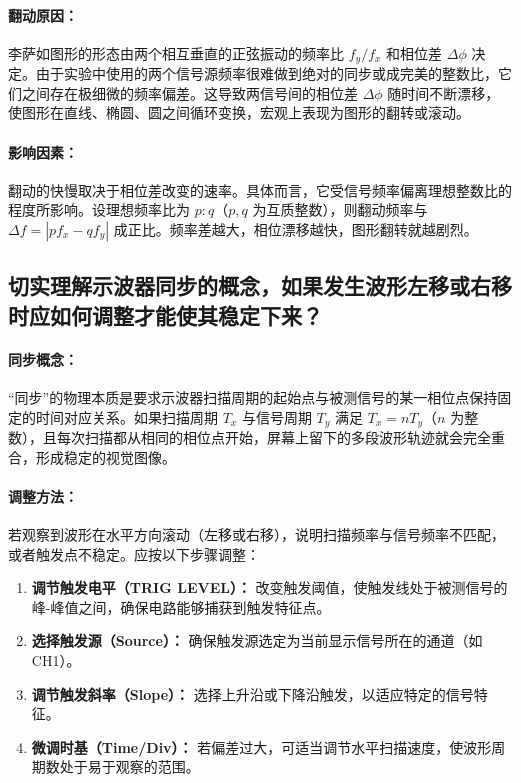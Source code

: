 \documentclass[]{../template/Report}%
\begin{document}
\paragraph{翻动原因：} 李萨如图形的形态由两个相互垂直的正弦振动的频率比 $f_y/f_x$ 和相位差 $\Delta\phi$ 决定。由于实验中使用的两个信号源频率很难做到绝对的同步或成完美的整数比，它们之间存在极细微的频率偏差。这导致两信号间的相位差 $\Delta\phi$ 随时间不断漂移，使图形在直线、椭圆、圆之间循环变换，宏观上表现为图形的翻转或滚动。

\paragraph{影响因素：} 翻动的快慢取决于相位差改变的速率。具体而言，它受信号频率偏离理想整数比的程度所影响。设理想频率比为 $p:q$（$p, q$ 为互质整数），则翻动频率与 $\Delta f = |p f_x - q f_y|$ 成正比。频率差越大，相位漂移越快，图形翻转就越剧烈。

\subsection{切实理解示波器同步的概念，如果发生波形左移或右移时应如何调整才能使其稳定下来？}

\paragraph{同步概念：} “同步”的物理本质是要求示波器扫描周期的起始点与被测信号的某一相位点保持固定的时间对应关系。如果扫描周期 $T_x$ 与信号周期 $T_y$ 满足 $T_x = n T_y$（$n$ 为整数），且每次扫描都从相同的相位点开始，屏幕上留下的多段波形轨迹就会完全重合，形成稳定的视觉图像。

\paragraph{调整方法：} 若观察到波形在水平方向滚动（左移或右移），说明扫描频率与信号频率不匹配，或者触发点不稳定。应按以下步骤调整：
\begin{enumerate}
    \item \textbf{调节触发电平（TRIG LEVEL）：} 改变触发阈值，使触发线处于被测信号的峰-峰值之间，确保电路能够捕获到触发特征点。
    \item \textbf{选择触发源（Source）：} 确保触发源选定为当前显示信号所在的通道（如 CH1）。
    \item \textbf{调节触发斜率（Slope）：} 选择上升沿或下降沿触发，以适应特定的信号特征。
    \item \textbf{微调时基（Time/Div）：} 若偏差过大，可适当调节水平扫描速度，使波形周期数处于易于观察的范围。
\end{enumerate}
\end{document}
